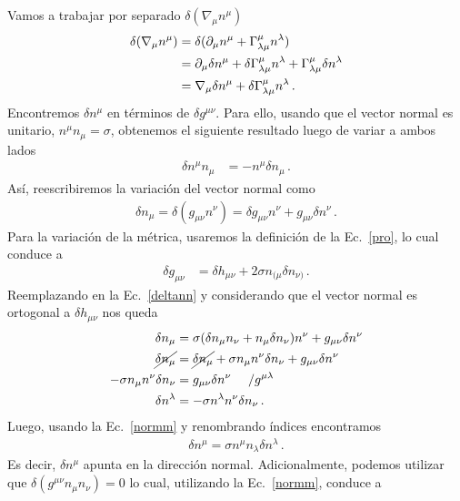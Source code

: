 \documentclass[../Main.tex]{subfiles}
\begin{document}
Vamos a trabajar por separado $\delta(\nabla_{\mu}n^{\mu})$
\begin{align} \notag
    \delta (\nabla_{\mu}n^{\mu})&=\delta (\partial_{\mu}n^{\mu}+\Gamma^{\mu}_{\lambda\mu}n^{\lambda})\\ \notag
&=\partial_{\mu}\delta n^{\mu}+\delta\Gamma^{\mu}_{\lambda\mu}n^{\lambda}+\Gamma^{\mu}_{\lambda\mu}\delta n^{\lambda}\\
&=\nabla_{\mu}\delta n^{\mu}+\delta\Gamma^{\mu}_{\lambda\mu}n^{\lambda} \, .\label{varnab}
\end{align}
Encontremos $\delta n^{\mu}$ en términos de $\delta g^{\mu\nu}$. Para ello, usando que el vector normal es unitario, $n^{\mu}n_{\mu}=\sigma$, obtenemos el siguiente resultado luego de variar a ambos lados
\begin{align} 
\delta n^{\mu}n_{\mu}&=-n^{\mu}\delta n_{\mu}\, . \label{normm}
\end{align}
Así, reescribiremos la variación del vector normal como
\begin{align}\label{deltann}
\delta n_{\mu}=\delta(g_{\mu\nu}n^{\nu})=\delta g_{\mu\nu}n^{\nu}+g_{\mu\nu}\delta n^{\nu}\, .
\end{align}
Para la variación de la métrica, usaremos la definición de la Ec.~\eqref{pro}, lo cual conduce a
\begin{align}
\delta g_{\mu\nu}&=\delta h_{\mu\nu}+2\sigma n_{(\mu}\delta n_{\nu)} \, .\label{vargn}
\end{align}
Reemplazando en la Ec.~\eqref{deltann} y considerando que el vector normal es ortogonal a $\delta h_{\mu\nu}$ nos queda
\begin{align} \notag
    \delta n_{\mu}&=\sigma(\delta n_{\mu}n_{\nu}+n_{\mu}\delta n_{\nu})n^{\nu}+g_{\mu\nu}\delta n^{\nu}\\ \notag
    \cancel{\delta n_{\mu}}&=\cancel{\delta n_{\mu}}+\sigma n_{\mu}n^{\nu}\delta n_{\nu}+g_{\mu\nu}\delta n^{\nu}\\ \notag
    -\sigma n_{\mu}n^{\nu}\delta n_{\nu}&=g_{\mu\nu}\delta n^{\nu}\,\, \,\,\,\,\,\, /g^{\mu\lambda}\\
    \delta n^{\lambda}&=-\sigma n^{\lambda}n^{\nu}\delta n_{\nu}\, . \label{varnorm2}
\end{align}
Luego, usando la Ec.~\eqref{normm} y renombrando índices encontramos
\begin{align}\label{deltanormal}
    \delta n^{\mu}=\sigma n^{\mu}n_{\lambda}\delta n^{\lambda}\, .
\end{align} 
Es decir, $\delta n^{
\mu}$ apunta en la dirección normal. Adicionalmente, podemos utilizar que $\delta(g^{\mu\nu}n_{\mu}n_{\nu})=0$ lo cual, utilizando la Ec.~\eqref{normm}, conduce a
\end{document}
